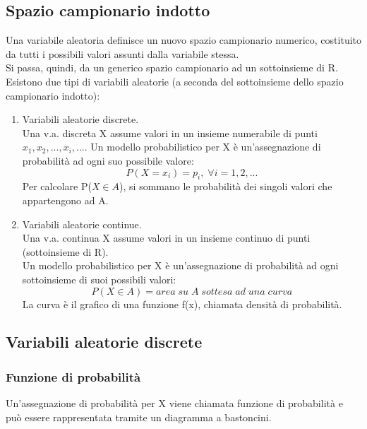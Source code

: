 \documentclass{article}
\begin{document}
\subsection{Spazio campionario indotto}
Una variabile aleatoria definisce un nuovo spazio campionario numerico, costituito da tutti i possibili valori assunti dalla variabile stessa.\\
Si passa, quindi, da un generico spazio campionario ad un sottoinsieme di R.\\
Esistono due tipi di variabili aleatorie (a seconda del sottoinsieme dello spazio campionario indotto):\\
\begin{enumerate}
  \item Variabili aleatorie discrete.\\
  Una v.a. discreta X assume valori in un insieme numerabile di punti ${x_1,x_2,...,x_i,...}$.
  Un modello probabilistico per X è un'assegnazione di probabilità ad ogni suo possibile valore:\\
  \begin{equation}
  P(X=x_i) = p_i, \; \forall{i=1,2,...}
  \end{equation}
Per calcolare P(${X}\in{A}$), si sommano le probabilità dei singoli valori che appartengono ad A.\\


  \item Variabili aleatorie continue.\\
  Una v.a. continua X assume valori in un insieme continuo di punti (sottoinsieme di R).\\
  Un modello probabilistico per X è un'assegnazione di probabilità ad ogni sottoinsieme di suoi possibili valori:\\
  \begin{equation}
    P({X}\in{A}) = area\; su\; A\; sottesa\; ad\; una\; curva
  \end{equation}
  La curva è il grafico di una funzione f(x), chiamata densità di probabilità.
  
\end{enumerate}
\subsection{Variabili aleatorie discrete}
\subsubsection{Funzione di probabilità}
Un'assegnazione di probabilità per X viene chiamata funzione di probabilità e può essere rappresentata tramite un diagramma a bastoncini.
\end{document}
